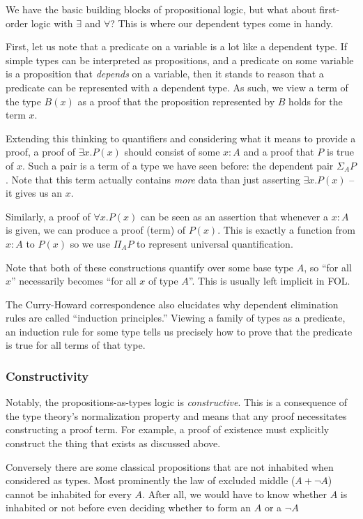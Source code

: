 We have the basic building blocks of propositional logic, but what about
first-order logic with $\exists$ and $\forall$? This is where our dependent
types come in handy.

First, let us note that a predicate on a variable is a lot like a dependent
type. If simple types can be interpreted as propositions, and a predicate on
some variable is a proposition that \emph{depends} on a variable, then it stands
to reason that a predicate can be represented with a dependent type. As such, we
view a term of the type $B(x)$ as a proof that the proposition represented by
$B$ holds for the term $x$.

Extending this thinking to quantifiers and considering what it means to provide
a proof, a proof of $\exists x. P(x)$ should consist of some $x:A$ and a proof
that $P$ is true of $x$. Such a pair is a term of a type we have seen before:
the dependent pair $\Sigma_A P$. Note that this term actually contains
\emph{more} data than just asserting $\exists x. P(x)$ -- it gives us an $x$.

Similarly, a proof of $\forall x. P(x)$ can be seen as an assertion that
whenever a $x:A$ is given, we can produce a proof (term) of $P(x)$. This is
exactly a function from $x:A$ to $P(x)$ so we use $\Pi_A P$ to represent universal
quantification.

Note that both of these constructions quantify over some base type $A$, so ``for
all $x$'' necessarily becomes ``for all $x$ of type $A$''. This is usually left
implicit in FOL.

The Curry-Howard correspondence also elucidates why dependent elimination rules
are called ``induction principles.'' Viewing a family of types as a predicate,
an induction rule for some type tells us precisely how to prove that the
predicate is true for all terms of that type.

\subsubsection{Constructivity}
Notably, the propositions-as-types logic is \emph{constructive}. This is a
consequence of the type theory's normalization property and means that
any proof necessitates constructing a proof term. For example, a proof of
existence must explicitly construct the thing that exists as discussed above.

Conversely there are some classical propositions that are not inhabited when
considered as types. Most prominently the law of excluded middle ($A + \neg A$)
cannot be inhabited for every $A$. After all, we would have to know whether $A$
is inhabited or not before even deciding whether to form an $A$ or a $\neg A$
